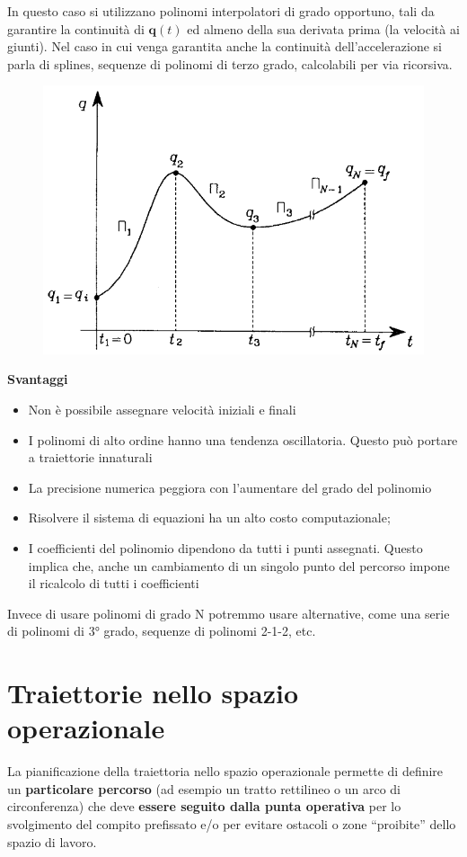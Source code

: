 In questo caso si utilizzano polinomi interpolatori di grado opportuno, tali da garantire la continuità di $\bm{q}(t)$ ed almeno della sua derivata prima (la velocità ai giunti). Nel caso in cui venga garantita anche la continuità dell’accelerazione si parla di splines, sequenze di polinomi di terzo grado, calcolabili per via ricorsiva.\\

\begin{figure}[ht!]
	\centering
	\includegraphics[width=0.5\linewidth]{images/trajectories_16}
	\caption{}
	\label{fig:trajectories16}
\end{figure}


\textbf{Svantaggi}
\begin{itemize}
	\item Non è possibile assegnare velocità iniziali e finali
	\item I polinomi di alto ordine hanno una tendenza oscillatoria. Questo può portare a traiettorie innaturali
	\item La precisione numerica peggiora con l'aumentare del grado del polinomio
	\item Risolvere il sistema di equazioni ha un alto costo computazionale;
	\item I coefficienti del polinomio dipendono da tutti i punti assegnati. Questo implica che, anche un cambiamento di un singolo punto del percorso impone il ricalcolo di tutti i coefficienti
\end{itemize}

Invece di usare polinomi di grado N potremmo usare alternative, come una serie di polinomi di 3° grado, sequenze di polinomi 2-1-2, etc.






\section{Traiettorie nello spazio operazionale}
La pianificazione della traiettoria nello spazio operazionale permette di definire un \textbf{particolare percorso} (ad esempio un tratto rettilineo o un arco di circonferenza) che deve \textbf{essere seguito dalla punta operativa} per lo svolgimento del compito prefissato e/o per evitare ostacoli o zone “proibite” dello spazio di lavoro.

